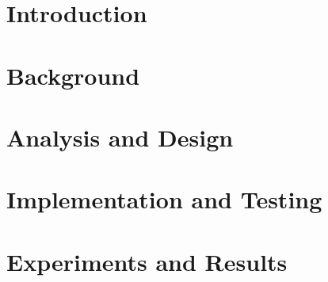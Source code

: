 \documentclass[ oneside,openany,titlepage,numbers=noenddot,headinclude,
                footinclude=true,BCOR=5mm,paper=a4,fontsize=12pt,a4paper,english]{scrreprt}
\begin{document}




\pagestyle{scrheadings}
\linespread{2}

\chapter{Introduction}
\label{Chapters/Introduction}





\chapter{Background}







\chapter{Analysis and Design}
\label{Chapters/Analysis-and-Design}






\chapter{Implementation and Testing}
\label{Chapters/Implementation}













\chapter{Experiments and Results}
\label{Chapters/Experiments-and-Results}



\end{document}
